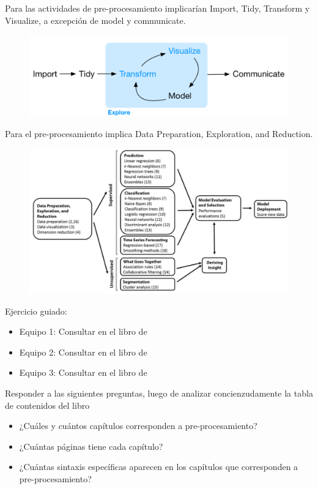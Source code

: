 \documentclass[aspectratio=169]{beamer}
\begin{document}
\begin{frame}
Para \citeauthor{Wickham2017} \citeyear{Wickham2017} las actividades de pre-procesamiento implicarían Import, Tidy, Transform y Visualize, a excepción de model y communicate.
\begin{figure}
\centering
\includegraphics[width=.8\textwidth]{DE.png}
\end{figure}
\end{frame}



\begin{frame}
Para \citeauthor{Shmueli2020} \citeyear{Shmueli2020} el pre-procesamiento implica Data Preparation, Exploration, and Reduction.

\begin{figure}
\centering
\includegraphics[width=.65\textwidth]{DM.png}
\end{figure}
\end{frame}

\begin{frame}
Ejercicio guiado:\\
\vspace{0.3cm}

\begin{itemize}
\item Equipo 1: Consultar en el libro de \citeauthor{Molin2021} \citeyear{Molin2021} 
\item Equipo 2: Consultar en el libro de \citeauthor{Wickham2017} \citeyear{Wickham2017}
\item Equipo 3: Consultar en el libro de \citeauthor{Shmueli2020} \citeyear{Shmueli2020}
\end{itemize}
\vspace{0.3cm}
Responder a las siguientes preguntas, luego de analizar concienzudamente la tabla de contenidos del libro
\begin{itemize}
\vspace{0.3cm}
\item ¿Cuáles y cuántos capítulos corresponden a pre-procesamiento?
\item ¿Cuántas páginas tiene cada capítulo?
\item ¿Cuántas sintaxis específicas aparecen en los capítulos que corresponden a pre-procesamiento?
\end{itemize}
\end{frame}
\end{document}
